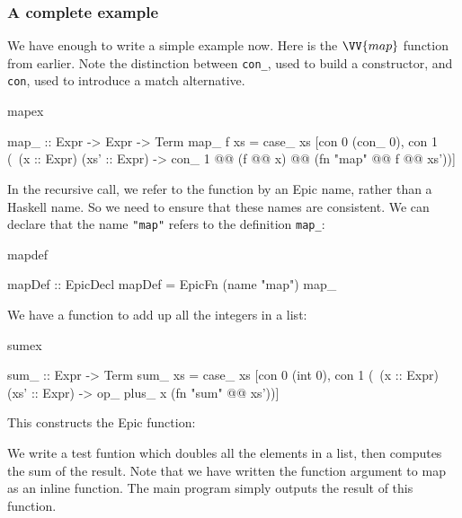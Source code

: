 \subsubsection*{A complete example}

We have enough to write a simple example now. Here is the $\VV{map}$
function from earlier. Note the distinction between \texttt{con\_},
used to build a constructor, and \texttt{con}, used to introduce a
match alternative.

\begin{SaveVerbatim}{mapex}

map_ :: Expr -> Expr -> Term
map_ f xs = case_ xs 
   [con 0 (con_ 0),
    con 1 (\ (x :: Expr) (xs' :: Expr)
      -> con_ 1 @@ (f @@ x) @@ (fn "map" @@ f @@ xs'))]

\end{SaveVerbatim}

In the recursive call, we refer to the function by an Epic name,
rather than a Haskell name. So we need to ensure that these names are
consistent. We can declare that the name \texttt{"map"} refers to the
definition \texttt{map\_}:

\begin{SaveVerbatim}{mapdef}

mapDef :: EpicDecl
mapDef = EpicFn (name "map") map_

\end{SaveVerbatim}

We have a function to add up all the integers in a list:

\begin{SaveVerbatim}{sumex}

sum_ :: Expr -> Term
sum_ xs = case_ xs
           [con 0 (int 0),
            con 1 (\ (x :: Expr) (xs' :: Expr) ->
                       op_ plus_ x (fn "sum" @@ xs'))]

\end{SaveVerbatim}

This constructs the Epic function:


We write a test funtion which doubles all the elements in a list, then
computes the sum of the result. Note that we have written the function
argument to map as an inline function. The main program simply outputs
the result of this function.


